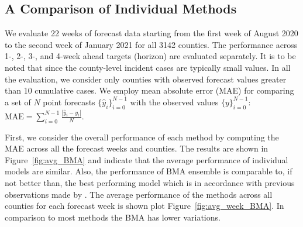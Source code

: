 \documentclass[sigconf]{acmart}
\begin{document}
\subsection{A Comparison of Individual Methods}
We evaluate 22 weeks of forecast data starting from the first week of August 2020 to the second week of January 2021 for all 3142 counties. The performance across 1-, 2-, 3-, and 4-week ahead targets (horizon) are evaluated separately. It is to be noted that since the county-level incident cases are typically small values. In all the evaluation, we consider only counties with observed forecast values greater than 10 cumulative cases. We employ mean absolute error (MAE) for comparing a set of $N$ point forecasts $\{\hat{y}_i\}_{i=0}^{N-1}$ with the observed values $\{y\}_{i=0}^{N-1}$: $\text{MAE}=\sum_{i=0}^{N-1}\frac{|\hat{y}_i-y_i|}{N}$.

First, we consider the overall performance of each method by computing the MAE across all the forecast weeks and counties. The results are shown in Figure~\ref{fig:avg_BMA} and indicate that the average performance of individual models are similar. Also, the performance of BMA ensemble is comparable to, if not better than, the best performing model which is in accordance with previous observations made by \cite{yamana2016superensemble, hoeting1999bayesian}. The average performance of the methods across all counties for each forecast week is shown plot Figure~\ref{fig:avg_week_BMA}. In comparison to most methods the BMA has lower variations. 
\end{document}
